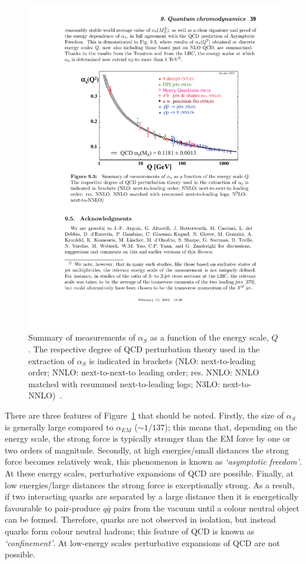 \begin{figure}[!htb]
  \begin{center}
    \includegraphics[width=0.8\linewidth, angle=0]{figs/Theory/qcd_running.pdf}
  \end{center}
  \caption[Summary of measurements of $\alpha_S$ as a function of the energy scale, $Q$.]
          {Summary of measurements of $\alpha_S$ as a function of the energy scale, $Q$.
            The respective degree of QCD perturbation theory used in the extraction of $\alpha_S$ is indicated in brackets
            (NLO: next-to-leading order; NNLO: next-to-next-to leading order; res. NNLO: NNLO matched with resummed next-to-leading logs; N3LO: next-to-NNLO)~\cite{obj-bjets_PDG}.}
          \label{fig:theo-qcd_running}
          \vspace{-1em}
\end{figure}

There are three features of Figure~\ref{fig:theo-qcd_running} that should be noted.
Firstly, the size of $\alpha_S$ is generally large compared to $\alpha_{EM}$ ($\sim 1/137$);
this means that, depending on the energy scale, the strong force is typically stronger than the EM force by one or two orders of magnitude.
Secondly, at high energies/small distances the strong force becomes relatively weak, this phenomenon is known as
\textit{`asymptotic freedom'}.
At these energy scales, perturbative expansions of QCD are possible.
Finally, at low energies/large distances the strong force is exceptionally strong.
As a result, if two interacting quarks are separated by a large distance then it is energetically favourable to
pair-produce $q\bar{q}$ pairs from the vacuum until a colour neutral object can be formed.
Therefore, quarks are not observed in isolation, but instead quarks form colour neutral hadrons; this feature of QCD is known as \textit{`confinement'}.
At low-energy scales perturbative expansions of QCD are not possible.

